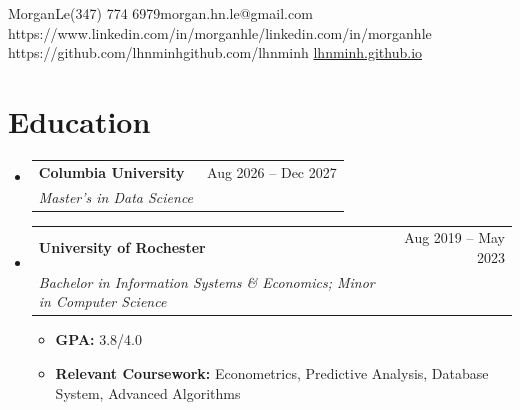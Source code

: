 \documentclass[a4paper,10pt]{article}
\makeatletter
\newcommand{\resumeItem}[1]{
  \item\small{{#1 \vspace{-2pt}}}
}
\newcommand{\resumeSubheading}[4]{
  \vspace{-2pt}\item
    \begin{tabular*}{0.97\textwidth}[t]{l@{\extracolsep{\fill}}r}
      \small\textbf{#1} & \small #2 \\
      \textit{\small #3} & \textit{\small #4} \\
    \end{tabular*}\vspace{-7pt}
}
\newcommand{\resumeSubHeadingListStart}{\begin{itemize}[leftmargin=0.15in,label={}]}
\newcommand{\resumeSubHeadingListEnd}{\end{itemize}}
\newcommand{\resumeItemListStart}{\begin{itemize}[leftmargin=0.22in]}
\newcommand{\resumeItemListEnd}{\end{itemize}\vspace{-5pt}}
\makeatother
\begin{document}
\resumeContactHeader
  {Morgan}{Le}{(347) 774 6979}{morgan.hn.le@gmail.com}
  {https://www.linkedin.com/in/morganhle/}{linkedin.com/in/morganhle}
  {https://github.com/lhnminh}{github.com/lhnminh}
  {\href{https://lhnminh.github.io/}{lhnminh.github.io}}

\section{Education}
\resumeSubHeadingListStart
  \resumeSubheading
    {Columbia University}{Aug 2026 -- Dec 2027}
    {Master's in Data Science}{}
  \resumeSubheading
    {University of Rochester}{Aug 2019 -- May 2023}
    {Bachelor in Information Systems \& Economics; Minor in Computer Science}{}
    \resumeItemListStart
      \resumeItem{{\bfseries GPA:} 3.8/4.0}
      \resumeItem{{\bfseries Relevant Coursework:} Econometrics, Predictive Analysis, Database System, Advanced Algorithms}
    \resumeItemListEnd
\resumeSubHeadingListEnd
\end{document}
